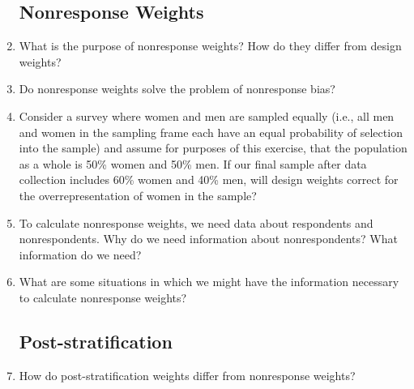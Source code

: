 \documentclass[12pt, a4]{article}
\begin{document}
\begin{enumerate}
\subsection*{Nonresponse Weights}

\item What is the purpose of nonresponse weights? How do they differ from design weights?
\item Do nonresponse weights solve the problem of nonresponse bias?
\item Consider a survey where women and men are sampled equally (i.e., all men and women in the sampling frame each have an equal probability of selection into the sample) and assume for purposes of this exercise, that the population as a whole is 50\% women and 50\% men. If our final sample after data collection includes 60\% women and 40\% men, will design weights correct for the overrepresentation of women in the sample?
\item To calculate nonresponse weights, we need data about respondents and nonrespondents. Why do we need information about nonrespondents? What information do we need?
\item What are some situations in which we might have the information necessary to calculate nonresponse weights?


\subsection*{Post-stratification}

\item How do post-stratification weights differ from nonresponse weights?


\end{enumerate}
\end{document}
